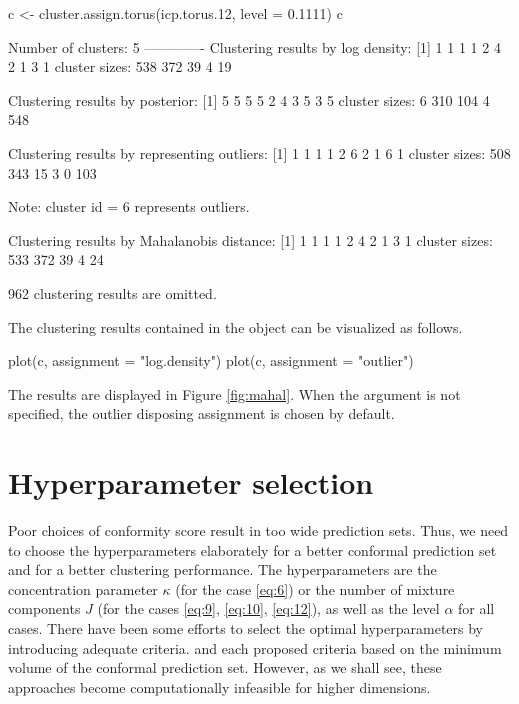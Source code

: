 \begin{example}
c <- cluster.assign.torus(icp.torus.12, level = 0.1111)
c

Number of clusters: 5
-------------
Clustering results by log density:
 [1] 1 1 1 1 2 4 2 1 3 1
cluster sizes: 538 372 39 4 19

Clustering results by posterior:
 [1] 5 5 5 5 2 4 3 5 3 5
cluster sizes: 6 310 104 4 548

Clustering results by representing outliers:
 [1] 1 1 1 1 2 6 2 1 6 1
cluster sizes: 508 343 15 3 0 103

 Note: cluster id = 6 represents outliers.

Clustering results by Mahalanobis distance:
 [1] 1 1 1 1 2 4 2 1 3 1
cluster sizes: 533 372 39 4 24

962 clustering results are omitted.
\end{example}


The clustering results contained in the object  can be visualized as follows.  

\begin{example}
plot(c, assignment = "log.density")
plot(c, assignment = "outlier")
\end{example}

The results are displayed in Figure \ref{fig:mahal}. When the argument  is not specified, the outlier disposing assignment is chosen by default. 


\section{Hyperparameter selection}

Poor choices of conformity score result in too wide prediction sets. Thus, we need to choose the hyperparameters elaborately for a better conformal prediction set and for a better clustering performance.  The hyperparameters are the concentration parameter $\kappa$ (for the case \eqref{eq:6}) or the number of mixture components $J$ (for the cases \eqref{eq:9}, \eqref{eq:10}, \eqref{eq:12}), as well as the level $\alpha$ for all cases. There have been some efforts to select the optimal hyperparameters by introducing adequate criteria. \citet{Lei:2013} and \citet{Jung:2021} each proposed criteria based on the minimum volume of the conformal prediction set. However, as we shall see, these approaches become computationally infeasible for higher dimensions.

